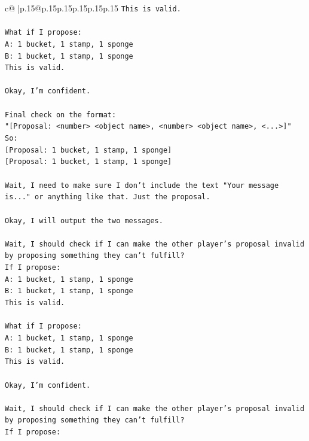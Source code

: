 \documentclass{article}
\begin{document}
{\begin{supertabular}{c@{$\;$}|p{.15\linewidth}@{}p{.15\linewidth}p{.15\linewidth}p{.15\linewidth}p{.15\linewidth}p{.15\linewidth}}
{{{\texttt{This is valid.} \\
\\ 
\texttt{What if I propose:} \\
\texttt{A: 1 bucket, 1 stamp, 1 sponge} \\
\texttt{B: 1 bucket, 1 stamp, 1 sponge} \\
\texttt{This is valid.} \\
\\ 
\texttt{Okay, I'm confident.} \\
\\ 
\texttt{Final check on the format:} \\
\texttt{"{[}Proposal: <number> <object name>, <number> <object name>, <...>{]}"} \\
\texttt{So:} \\
\texttt{{[}Proposal: 1 bucket, 1 stamp, 1 sponge{]}} \\
\texttt{{[}Proposal: 1 bucket, 1 stamp, 1 sponge{]}} \\
\\ 
\texttt{Wait, I need to make sure I don't include the text "Your message is..." or anything like that. Just the proposal.} \\
\\ 
\texttt{Okay, I will output the two messages.} \\
\\ 
\texttt{Wait, I should check if I can make the other player's proposal invalid by proposing something they can't fulfill?} \\
\texttt{If I propose:} \\
\texttt{A: 1 bucket, 1 stamp, 1 sponge} \\
\texttt{B: 1 bucket, 1 stamp, 1 sponge} \\
\texttt{This is valid.} \\
\\ 
\texttt{What if I propose:} \\
\texttt{A: 1 bucket, 1 stamp, 1 sponge} \\
\texttt{B: 1 bucket, 1 stamp, 1 sponge} \\
\texttt{This is valid.} \\
\\ 
\texttt{Okay, I'm confident.} \\
\\ 
\texttt{Wait, I should check if I can make the other player's proposal invalid by proposing something they can't fulfill?} \\
\texttt{If I propose:} \\
}}}
\end{supertabular}}
\end{document}
